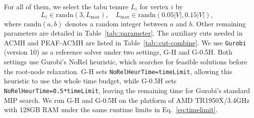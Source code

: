 \documentclass[12pt, a4paper]{article}%
\newcommand{\randn}{\ensuremath{\mathrm{randn}}}
\numberwithin{equation}{section}
\theoremstyle{plain}
\newcommand{\blue}{\textcolor{blue}}
\begin{document}
			For all of them, we select the tabu tenure $L_i$ for vertex $i$ by
			\begin{equation}
				\label{tabu::tenure}
				L_i\in \randn(3, L_{\max}),\quad L_{\max}\in \randn\left(0.05 |V|, 0.15 |V|\right),
			\end{equation}
			where $\randn(a,b)$ denotes a random integer between $a$ and $b$. Other remaining parameters are detailed in Table~\ref{tab::parameter}.
			The auxiliary cuts needed in ACMH and PEAF-ACMH are listed in Table~\ref{tab::cut-combine}. 
            {We use \texttt{Gurobi} (version 10) as a reference solver under two settings,
G-H and G-0.5H. Both settings use Gurobi's NoRel heuristic, which searches for
feasible solutions before the root-node relaxation. G-H sets
\texttt{NoRelHeurTime=timeLimit}, allowing this heuristic to use the whole time
budget, while G-0.5H sets \texttt{NoRelHeurTime=0.5*timeLimit}, leaving the
remaining time for Gurobi's standard MIP search.}            
			We run G-H and G-0.5H on the platform of AMD TR1950X/3.4GHz with 128GB RAM under the same runtime limits in Eq.~\eqref{eq:timelimit}. 
			
			
			
			
			
			
			
			
			
\end{document}
